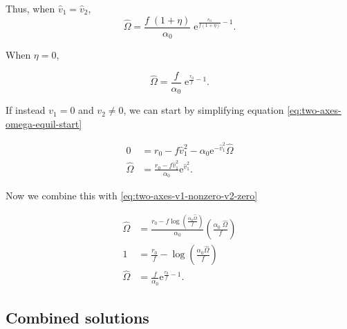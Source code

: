 Thus, when $\hat{v}_1 = \hat{v}_2$,
$$
\hat{\Omega} = \frac{ f \; ( 1 + \eta ) }{ \alpha_0 } \;
        \textrm{e}^{\frac{ r_0 }{ f ( 1 + \eta ) } - 1 }
    \textrm{.}
$$


\noindent When $\eta = 0$,

$$
    \hat{\Omega} = \frac{ f }{ \alpha_0 } \; \textrm{e}^{\frac{ r_0 }{ f } - 1 }
    \textrm{.}
$$



If instead $v_1 = 0$ and $v_2 \ne 0$, we can start by simplifying equation
\ref{eq:two-axes-omega-equil-start}

\begin{equation*}
\begin{split}
    0 &= r_0 - f \hat{v}_{1}^2 -
        \alpha_0 \textrm{e}^{ - \hat{v}_{1}^2 } \hat{\Omega} \\
    \hat{\Omega} &= \frac{ r_0 - f \hat{v}_{1}^2 }{ \alpha_0 } \textrm{e}^{ \hat{v}_{1}^2 }
    \textrm{.}
\end{split}
\end{equation*}

Now we combine this with \ref{eq:two-axes-v1-nonzero-v2-zero}

\begin{equation*}
\begin{split}
    \hat{\Omega} &= \frac{ r_0 - f \log \left( \frac{\alpha_0 \hat{\Omega}}{f} \right) }{
        \alpha_0 } \left( \frac{\alpha_0 \; \hat{\Omega}}{f} \right) \\
    1 &= \frac{ r_0 }{ f } - \log \left( \frac{\alpha_0 \hat{\Omega}}{f} \right) \\
    \hat{\Omega} &= \frac{f}{\alpha_0} \textrm{e}^{\frac{r_0}{f} - 1}
    \textrm{.}
\end{split}
\end{equation*}



















\subsection*{Combined solutions}

